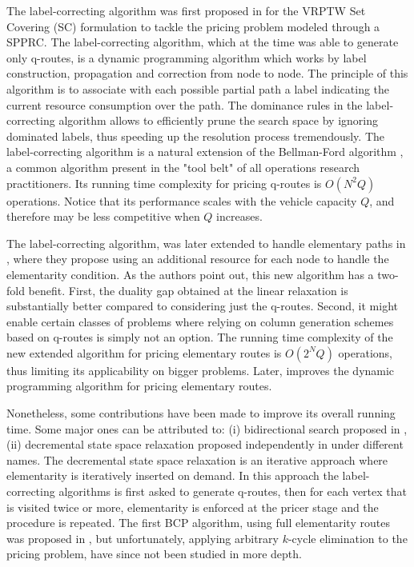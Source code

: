The label-correcting algorithm was first proposed in \textcite{desrochers1992}
for the VRPTW Set Covering (SC) formulation
to tackle the pricing problem modeled through a SPPRC.
The label-correcting algorithm, which at the time was able to generate only q-routes,
is a dynamic programming algorithm
which works by label construction, propagation and correction from node to node.
The principle of this algorithm is to associate with each possible partial
path a label indicating the current resource consumption over the path.
The dominance rules in the label-correcting algorithm allows
to efficiently prune the search space by ignoring dominated labels, thus speeding
up the resolution process tremendously.
The label-correcting algorithm
is a natural extension of the Bellman-Ford algorithm \parencite{bellman1958, fordjr1956},
a common algorithm present in the "tool belt" of all operations research practitioners.
Its running time complexity for pricing q-routes is $O(N^2 Q)$ operations.
Notice that its performance scales with the vehicle capacity $Q$, and therefore
may be less competitive when $Q$ increases.

The label-correcting algorithm, was later extended to handle
elementary paths in \textcite{feillet2004},
where they propose using an additional resource for each node
to handle the elementarity condition.
As the authors point out, this new algorithm has a two-fold benefit.
First, the duality gap obtained at the linear relaxation is substantially better
compared to considering just the q-routes.
Second, it might enable certain classes of problems where relying
on column generation schemes based on q-routes is simply not an option.
The running time complexity of the new extended algorithm for pricing elementary routes
is $O(2^N Q)$ operations,
thus limiting its applicability on bigger problems.
Later, \textcite{righini2006} improves the dynamic programming
algorithm for pricing elementary routes.

Nonetheless, some contributions have been made to improve its overall running time.
Some major ones can be attributed to:
(i) bidirectional search proposed in \textcite{righini2006},
(ii) decremental state space relaxation proposed independently in
\textcite{boland2006, righini2008} under different names.
The decremental state space relaxation is an iterative
approach where elementarity is iteratively inserted on demand.
In this approach the label-correcting algorithms
is first asked to generate q-routes, then for each vertex that is visited
twice or more, elementarity is enforced at the pricer stage
and the procedure is repeated.
The first BCP algorithm, using full elementarity routes
was proposed in \cite{chabrier2006}, but unfortunately,
applying arbitrary $k$-cycle elimination to the pricing problem,
have since not been studied in more depth.


